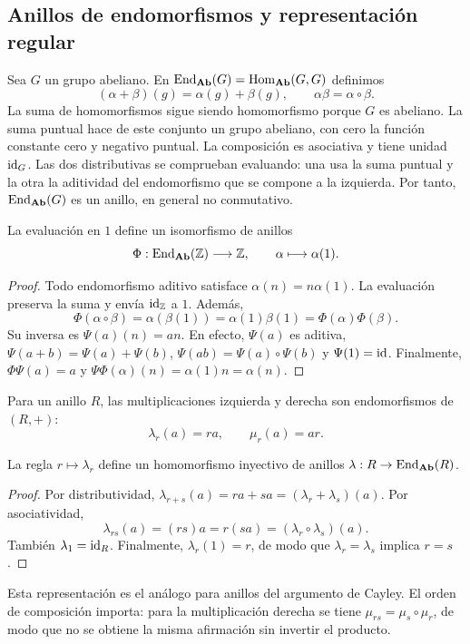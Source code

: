 \subsection{Anillos de endomorfismos y representación regular}\label{tema:12-1-2}
Sea $G$ un grupo abeliano. En $\operatorname{End}_{\mathbf{Ab}}(G)=\operatorname{Hom}_{\mathbf{Ab}}(G,G)$ definimos
\[
(\alpha+\beta)(g)=\alpha(g)+\beta(g),\qquad
\alpha\beta=\alpha\circ\beta.
\]
La suma de homomorfismos sigue siendo homomorfismo porque $G$ es abeliano. La suma puntual hace de este conjunto un grupo abeliano, con cero la función constante cero y negativo puntual. La composición es asociativa y tiene unidad $\operatorname{id}_G$. Las dos distributivas se comprueban evaluando: una usa la suma puntual y la otra la aditividad del endomorfismo que se compone a la izquierda. Por tanto, $\operatorname{End}_{\mathbf{Ab}}(G)$ es un anillo, en general no conmutativo.


\begin{prop}\label{prop:C12-endZ}
La evaluación en $1$ define un isomorfismo de anillos
\[
\Phi:\operatorname{End}_{\mathbf{Ab}}(\mathbb Z)\longrightarrow\mathbb Z,
\qquad\alpha\longmapsto\alpha(1).
\]
\end{prop}
\begin{proof}
Todo endomorfismo aditivo satisface $\alpha(n)=n\alpha(1)$. La evaluación preserva la suma y envía $\operatorname{id}_{\mathbb Z}$ a $1$. Además,
\[
\Phi(\alpha\circ\beta)=\alpha(\beta(1))
=\alpha(1)\beta(1)=\Phi(\alpha)\Phi(\beta).
\]
Su inversa es $\Psi(a)(n)=an$. En efecto, $\Psi(a)$ es aditiva, $\Psi(a+b)=\Psi(a)+\Psi(b)$, $\Psi(ab)=\Psi(a)\circ\Psi(b)$ y $\Psi(1)=\operatorname{id}$. Finalmente, $\Phi\Psi(a)=a$ y $\Psi\Phi(\alpha)(n)=\alpha(1)n=\alpha(n)$.
\end{proof}


Para un anillo $R$, las multiplicaciones izquierda y derecha son endomorfismos de $(R,+)$:
\[
\lambda_r(a)=ra,\qquad \mu_r(a)=ar.
\]
\begin{prop}\label{prop:C12-regular}
La regla $r\mapsto\lambda_r$ define un homomorfismo inyectivo de anillos $\lambda:R\to\operatorname{End}_{\mathbf{Ab}}(R)$.
\end{prop}
\begin{proof}
Por distributividad, $\lambda_{r+s}(a)=ra+sa=(\lambda_r+\lambda_s)(a)$. Por asociatividad,
\[
\lambda_{rs}(a)=(rs)a=r(sa)=(\lambda_r\circ\lambda_s)(a).
\]
También $\lambda_1=\operatorname{id}_R$. Finalmente, $\lambda_r(1)=r$, de modo que $\lambda_r=\lambda_s$ implica $r=s$.
\end{proof}
Esta representación es el análogo para anillos del argumento de Cayley. El orden de composición importa: para la multiplicación derecha se tiene $\mu_{rs}=\mu_s\circ\mu_r$, de modo que no se obtiene la misma afirmación sin invertir el producto.
